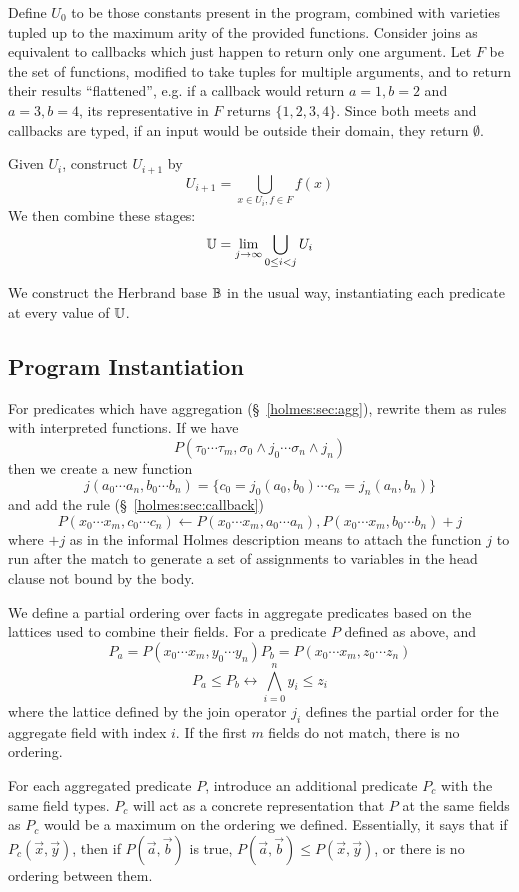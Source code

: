 Define $U_0$ to be those constants present in the program, combined with varieties tupled up to the maximum arity of the provided functions.
Consider joins as equivalent to callbacks which just happen to return only one argument.
Let $F$ be the set of functions, modified to take tuples for multiple arguments, and to return their results ``flattened'', e.g. if a callback would return $a = 1, b = 2$ and $a = 3, b = 4$, its representative in $F$ returns $\{1, 2, 3, 4\}$.
Since both meets and callbacks are typed, if an input would be outside their domain, they return $\emptyset$.

Given $U_i$, construct $U_{i + 1}$ by
\[
	U_{i + 1} = \bigcup_{x \in U_i, f \in F} f(x)
\]
We then combine these stages:
\[
	\mathbb{U} = \lim_{j \rightarrow \infty} \bigcup_{0 \leq i < j} U_i
\]

We construct the Herbrand base $\mathbb{B}$ in the usual way, instantiating each predicate at every value of $\mathbb{U}$.

\subsection{Program Instantiation}
For predicates which have aggregation (\S~\ref{holmes:sec:agg}), rewrite them as rules with interpreted functions.
If we have
\[
	P(\tau_0 \cdots \tau_m, \sigma_0\wedge j_0 \cdots \sigma_n \wedge j_n)
\]
then we create a new function
\[
	j(a_0 \cdots a_n, b_0 \cdots b_n) = \{c_0 = j_0(a_0, b_0) \cdots c_n = j_n(a_n, b_n)\}
\]
and add the rule (\S~\ref{holmes:sec:callback})
\[
	P(x_0 \cdots x_m, c_0 \cdots c_n) \leftarrow P(x_0 \cdots x_m, a_0 \cdots a_n), P(x_0 \cdots x_m, b_0 \cdots b_n) + j
\]
where $+ j$ as in the informal Holmes description means to attach the function $j$ to run after the match to generate a set of assignments to variables in the head clause not bound by the body.

We define a partial ordering over facts in aggregate predicates based on the lattices used to combine their fields.
For a predicate $P$ defined as above, and
\[
	P_a = P(x_0 \cdots x_m, y_0 \cdots y_n)
	P_b = P(x_0 \cdots x_m, z_0 \cdots z_n)
\]
\[
	P_a \leq P_b \leftrightarrow \bigwedge_{i = 0}^n y_i \leq z_i
\]
where the lattice defined by the join operator $j_i$ defines the partial order for the  aggregate field with index $i$.
If the first $m$ fields do not match, there is no ordering.

For each aggregated predicate $P$, introduce an additional predicate $P_c$ with the same field types.
$P_c$ will act as a concrete representation that $P$ at the same fields as $P_c$ would be a maximum on the ordering we defined.
Essentially, it says that if $P_c(\vec{x}, \vec{y})$, then if $P(\vec{a}, \vec{b})$ is true, $P(\vec{a}, \vec{b}) \leq P(\vec{x}, \vec{y})$, or there is no ordering between them.

